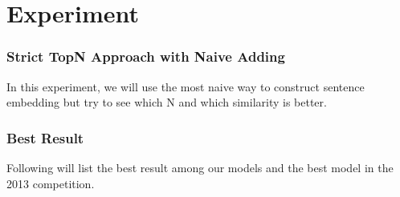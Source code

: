 \section{Experiment}
\label{sec:experiment}

\subsubsection*{Strict TopN Approach with Naive Adding}

In this experiment, we will use the most naive way to construct sentence embedding but try to see which N and which similarity is better.



\subsubsection*{Best Result}

Following will list the best result among our models and the best model in the 2013 competition.


